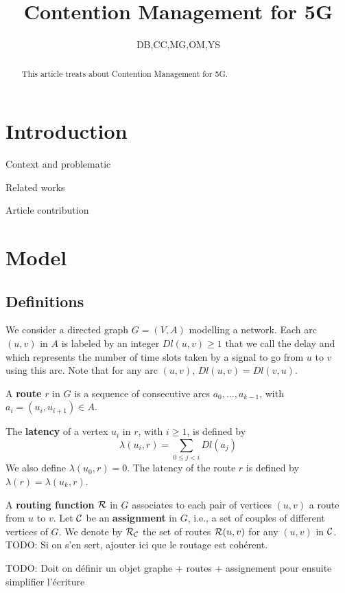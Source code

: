 \documentclass[a4paper,10pt]{article}
\title{Contention Management for 5G}
\author{DB,CC,MG,OM,YS}
\newcommand{\todo}[1]{{\color{red} TODO: {#1}}}
\begin{document}
\maketitle

\begin{abstract}
This article treats about Contention Management for 5G.
\end{abstract}

\section{Introduction}
  \itemize
    \item Context and problematic
    \item Related works
    \item Article contribution

\section{Model}

  \subsection{Definitions}
  
	We consider a directed graph $G=(V,A)$ modelling a network. Each arc  $(u,v)$ in $A$ is labeled by an integer $Dl(u,v) \geq 1$ that we call the delay and
	which represents the number of time slots taken by a signal to go from $u$ to $v$ using this arc. Note that for any arc $(u,v)$, $Dl(u,v)=Dl(v,u)$.
	
      A {\bf route} $r$ in $G$ is a sequence of consecutive arcs $a_0, \ldots , a_{k-1}$, with $a_i=(u_i,u_{i+1}) \in A$. 
      
      The {\bf latency} of a vertex $u_i$ in $r$, with $i \geq 1$, is defined by $$\lambda(u_i,r)= \sum\limits_{0 \leq j <i} Dl(a_j)$$ We also define $\lambda(u_0,r)=0$.
      The latency of the route $r$ is defined by $\lambda (r)= \lambda (u_k,r)$.
      
      A {\bf routing function} $\cal R$ in $G$ associates to each pair of vertices $(u,v)$ a route from $u$ to $v$. Let $\cal C$ be an {\bf assignment} in $G$, i.e., a set of couples of different vertices of $G$. We denote by $\cal R_{\cal C}$ the set of routes ${\cal R}(u,v)$ for any $(u,v)$ in $\cal C$. \todo{Si on s'en sert, ajouter ici que le routage est cohérent.}
      
      \todo{Doit on définir un objet graphe + routes + assignement pour ensuite simplifier l'écriture}
\end{document}
